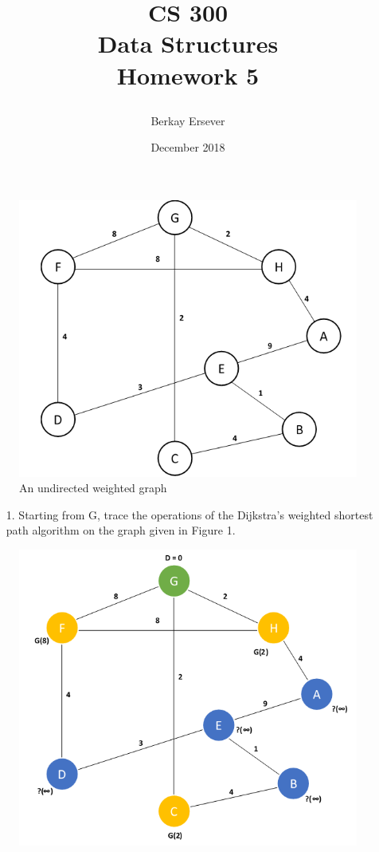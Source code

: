\documentclass{article}
\title{\protect\parbox{\textwidth}{\protect\centering CS 300\\ Data Structures\\ Homework 5}}
\author{Berkay Ersever}
\date{December 2018}
\begin{document}
\maketitle

\begin{figure}[H]
\centering
\includegraphics[scale=0.8]{figure-1}
\caption{An undirected weighted graph}
\end{figure}


\begin{enumerate}[leftmargin=\labelsep]
  \item[1.] Starting from G, trace the operations of the Dijkstra's weighted shortest path algorithm on the graph given in Figure 1.
\end{enumerate}

\begin{figure}[H]
\centering
\includegraphics[scale=0.6]{images/Q1/01.png}
\end{figure}
\end{document}
